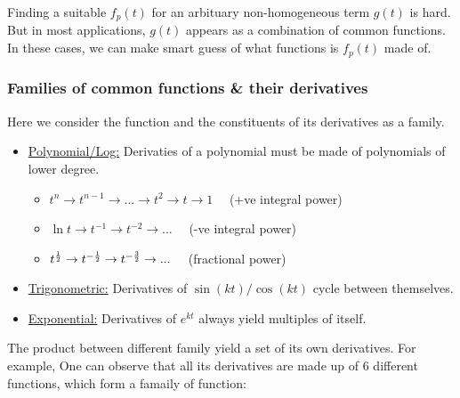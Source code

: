 \documentclass[class=article, crop=false, 12pt]{standalone}
\begin{document}
Finding a suitable $f_p(t)$ for an arbituary non-homogeneous term $g(t)$ is hard. 
But in most applications, $g(t)$ appears as a combination of common functions.
In these cases, we can make smart guess of what functions is $f_p(t)$ made of.

\subsubsection{Families of common functions \& their derivatives}

Here we consider the function and the constituents of its derivatives as a family.

\begin{itemize}
    \item \ul{Polynomial/Log:} Derivaties of a polynomial must be made of polynomials of lower degree.
    \begin{itemize}
        \item $t^n \to t^{n-1} \to ...\to t^2 \to t \to 1 \quad$ (+ve integral power)
        \item $\ln t \to t^{-1} \to t^{-2} \to ... \quad$ (-ve integral power)
        \item $t^{\frac{1}{2}} \to t^{-\frac{1}{2}} \to t^{-\frac{3}{2}} \to ...\quad $ (fractional power)
    \end{itemize}

    \item \ul{Trigonometric:} Derivatives of $\sin{(kt)}/\cos{(kt)}$ cycle between themselves.
    
    \item \ul{Exponential:} Derivatives of $e^{kt}$ always yield multiples of itself.
\end{itemize}

The product between different family yield a set of its own derivatives. For example,
One can observe that all its derivatives are made up of 6 different functions,
which form a famaily of function:
\end{document}
